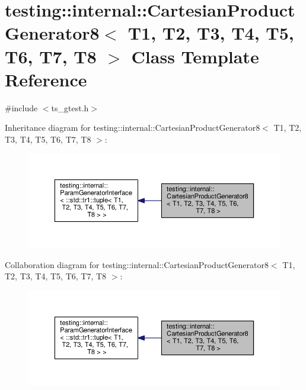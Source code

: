 \hypertarget{classtesting_1_1internal_1_1CartesianProductGenerator8}{\section{testing\-:\-:internal\-:\-:Cartesian\-Product\-Generator8$<$ T1, T2, T3, T4, T5, T6, T7, T8 $>$ Class Template Reference}
\label{classtesting_1_1internal_1_1CartesianProductGenerator8}
}


{\ttfamily \#include $<$ts\-\_\-gtest.\-h$>$}



Inheritance diagram for testing\-:\-:internal\-:\-:Cartesian\-Product\-Generator8$<$ T1, T2, T3, T4, T5, T6, T7, T8 $>$\-:\nopagebreak
\begin{figure}[H]
\begin{center}
\leavevmode
\includegraphics[width=350pt]{classtesting_1_1internal_1_1CartesianProductGenerator8__inherit__graph}
\end{center}
\end{figure}


Collaboration diagram for testing\-:\-:internal\-:\-:Cartesian\-Product\-Generator8$<$ T1, T2, T3, T4, T5, T6, T7, T8 $>$\-:\nopagebreak
\begin{figure}[H]
\begin{center}
\leavevmode
\includegraphics[width=350pt]{classtesting_1_1internal_1_1CartesianProductGenerator8__coll__graph}
\end{center}
\end{figure}
